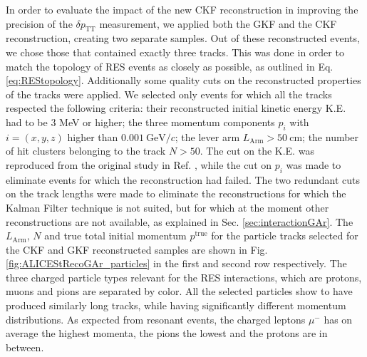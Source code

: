 In order to evaluate the impact of the new CKF reconstruction in improving the precision of the $\delta p_\text{TT}$ measurement, we applied both the GKF and the CKF reconstruction, creating two separate samples. Out of these reconstructed events, we chose those that contained exactly three tracks. This was done in order to match the topology of RES events as closely as possible, as outlined in Eq. \ref{eq:REStopology}. Additionally some quality cuts on the reconstructed properties of the tracks were applied. We selected only events for which all the tracks respected the following criteria: their reconstructed initial kinetic energy K.E. had to be 3 MeV or higher; the three momentum components $p_i$ with $i=(x,y,z)$ higher than $0.001 \ \text{GeV}/c$; the lever arm $L_\text{Arm}>50 \ \text{cm}$; the number of hit clusters belonging to the track $N>50$. The cut on the K.E. was reproduced from the original study in Ref. \cite{PhysRevC.94.015503}, while the cut on $p_i$ was made to eliminate events for which the reconstruction had failed. The two redundant cuts on the track lengths were made to eliminate the reconstructions for which the Kalman Filter technique is not suited, but for which at the moment other reconstructions are not available, as explained in Sec. \ref{sec:interactionGAr}. The $L_\text{Arm}$, $N$ and true total initial momentum $p^\text{true}$ for the particle tracks selected for the CKF and GKF reconstructed samples are shown in Fig. \ref{fig:ALICEStRecoGAr_particles} in the first and second row respectively. The three charged particle types relevant for the RES interactions, which are protons, muons and pions are separated by color. All the selected particles show to have produced similarly long tracks, while having significantly different momentum distributions. As expected from resonant events, the charged leptons $\mu^-$ has on average the highest momenta, the pions the lowest and the protons are in between.  


